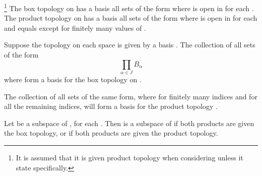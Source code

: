 \begin{theorem}\label{theorem:BoxProductTopologyComparison}\footnote{
      It is assumed that it is given product topology when considering  unless it state specifically.
}
      The box topology on  has a basis all sets of the form  where  is open in  for each \mt{\alpha}. The product topology on  has a basis all sets of the form  where  is open in  for each \mt{\alpha} and  equals  except for finitely many values of \mt{\alpha}.
\end{theorem}

\begin{theorem}\omitObviuos
      Suppose the topology on each space  is given by a basis . The collection of all sets of the form
      \begin{equation*}
            \prod_{\alpha \in J} B_{\alpha}
      \end{equation*}
      where  form a basis for the box topology on .

      The collection of all sets of the same form, where  for finitely many indices \mt{\alpha} and  for all the remaining indices, will form a basis for the product topology .
\end{theorem}

\begin{theorem}\omitObviuos
      Let  be a subspace of , for each . Then  is a subspace of  if both products are given the box topology, or if both products are given the product topology.
\end{theorem}

